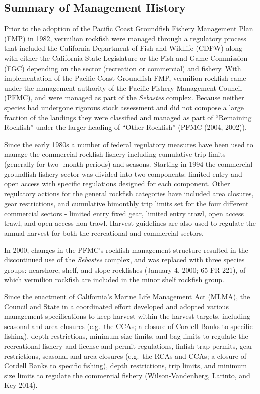 \documentclass[
  english,
  a4paper,
]{article}
\begin{document}
\hypertarget{summary-of-management-history}{%
\subsection{Summary of Management History}\label{summary-of-management-history}}

Prior to the adoption of the Pacific Coast Groundfish Fishery Management Plan (FMP)
in 1982, vermilion rockfish were managed through a regulatory process that included the
California Department of Fish and Wildlife (CDFW) along
with either the California State Legislature or the Fish and Game Commission (FGC)
depending on the sector (recreation or commercial) and fishery. With implementation
of the Pacific Coast Groundfish FMP, vermilion rockfish came under the management
authority of the Pacific Fishery Management Council (PFMC), and were managed as part
of the \emph{Sebastes} complex. Because neither species had undergone rigorous stock assessment
and did not compose a large fraction of the landings they were classified and
managed as part of ``Remaining Rockfish'' under the larger
heading of ``Other Rockfish'' (PFMC (2004, 2002)).

Since the early 1980s a number of federal regulatory measures have been used to
manage the commercial rockfish fishery including cumulative trip limits (generally
for two- month periods) and seasons. Starting in 1994 the commercial groundfish
fishery sector was divided into two components: limited entry and open access
with specific regulations designed for each component. Other regulatory actions
for the general rockfish categories have included area closures, gear restrictions,
and cumulative bimonthly trip limits set for the four different commercial sectors -
limited entry fixed gear, limited entry trawl, open access trawl, and open access non-trawl.
Harvest guidelines are also used to regulate the annual harvest for both the recreational and
commercial sectors.

In 2000, changes in the PFMC's rockfish management structure resulted in the discontinued
use of the \emph{Sebastes} complex, and was replaced with three species
groups: nearshore, shelf, and slope rockfishes (January 4, 2000; 65 FR 221), of
which vermilion rockfish are included in the minor shelf rockfish group.

Since the enactment of California's Marine Life Management Act (MLMA), the Council and State in a coordinated
effort developed and adopted various management specifications to keep harvest
within the harvest targets, including seasonal and area closures (e.g.~the CCAs;
a closure of Cordell Banks to specific fishing), depth restrictions, minimum
size limits, and bag limits to regulate the recreational fishery and license
and permit regulations, finfish trap permits, gear restrictions, seasonal
and area closures (e.g.~the RCAs and CCAs; a closure of Cordell Banks to
specific fishing), depth restrictions, trip limits, and minimum size
limits to regulate the commercial fishery (Wilson-Vandenberg, Larinto, and Key 2014).
\end{document}
